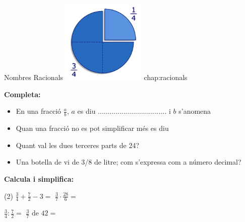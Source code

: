 {Nombres Racionals}
{\includegraphics[width=4cm]{img-01/image1.png}}
{chap:racionals}
 
\vspace{1cm}
\begin{iniaval}
	\textbf{Completa:}
	
	\begin{itemize}
		\item En una fracció $\frac{a}{b}$, $a$ es diu ................................... i $b$ s'anomena \dotfill
		
		\item  Quan una fracció no es pot simplificar més es diu \dotfill
		
		\item  Quant val les dues terceres parts de 24?  \dotfill
		
		\item  Una botella de vi de 3/8 de litre; com s'expressa com a número decimal? \dotfill
	\end{itemize}
	
	\vspace{0.5cm}
	\textbf{Calcula i simplifica:}
	
	\begin{tasks}(2)
		\task $\frac{3}{4}+\frac{7}{2}-3=$    \task $\frac{3}{7}\cdot\frac{28}{6}=$
		
		\task $\frac{3}{4}:\frac{7}{2}=$      \task $\frac{3}{7} \text{ de } 42=$
	\end{tasks}	

	\vsoo
\end{iniaval}



